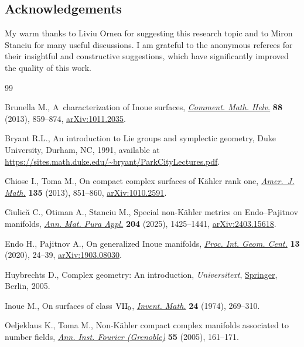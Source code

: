 \documentclass[pdftex]{sigma}
\newcommand{\6}{\partial}
\numberwithin{equation}{section}
\begin{document}
\subsection*{Acknowledgements}
My warm thanks to Liviu Ornea for suggesting this research topic and to Miron Stanciu for many useful discussions. I am grateful to the anonymous referees for their insightful and constructive suggestions, which have significantly improved the quality of this work.

\begin{thebibliography}{99}
\footnotesize\itemsep=0pt

Brunella M., A~characterization of {I}noue surfaces,
 \href{https://doi.org/10.4171/CMH/305}{\textit{Comment. Math. Helv.}}
 \textbf{88} (2013), 859--874,
 \href{http://arxiv.org/abs/1011.2035}{arXiv:1011.2035}.

Bryant R.L., An introduction to Lie groups and symplectic geometry, Duke
 University, Durham, NC, 1991, available at
 \url{https://sites.math.duke.edu/~bryant/ParkCityLectures.pdf}.

Chiose I., Toma M., On compact complex surfaces of {K}\"ahler rank one,
 \href{https://doi.org/10.1353/ajm.2013.0022}{\textit{Amer.~J. Math.}}
 \textbf{135} (2013), 851--860,
 \href{http://arxiv.org/abs/1010.2591}{arXiv:1010.2591}.

Ciulic\u{a} C., Otiman A., Stanciu M., Special non-{K}\"ahler metrics on
 {E}ndo--{P}ajitnov manifolds,
 \href{https://doi.org/10.1007/s10231-024-01533-0}{\textit{Ann. Mat. Pura
 Appl.}} \textbf{204} (2025), 1425--1441,
 \href{http://arxiv.org/abs/2403.15618}{arXiv:2403.15618}.

Endo H., Pajitnov A., On generalized {I}noue manifolds,
 \href{https://doi.org/10.15673/tmgc.v13i4.1748}{\textit{Proc. Int. Geom.
 Cent.}} \textbf{13} (2020), 24--39,
 \href{http://arxiv.org/abs/1903.08030}{arXiv:1903.08030}.

Huybrechts D., Complex geometry: {A}n introduction, \textit{Universitext},
 \href{https://doi.org/10.1007/b137952}{Springer}, Berlin, 2005.

Inoue M., On surfaces of class {${\rm VII}_{0}$},
 \href{https://doi.org/10.1007/BF01425563}{\textit{Invent. Math.}} \textbf{24}
 (1974), 269--310.

Oeljeklaus K., Toma M., Non-{K}\"ahler compact complex manifolds associated to
 number fields, \href{https://doi.org/10.5802/aif.2093}{\textit{Ann. Inst.
 Fourier (Grenoble)}} \textbf{55} (2005), 161--171.


\end{thebibliography}
\end{document}
